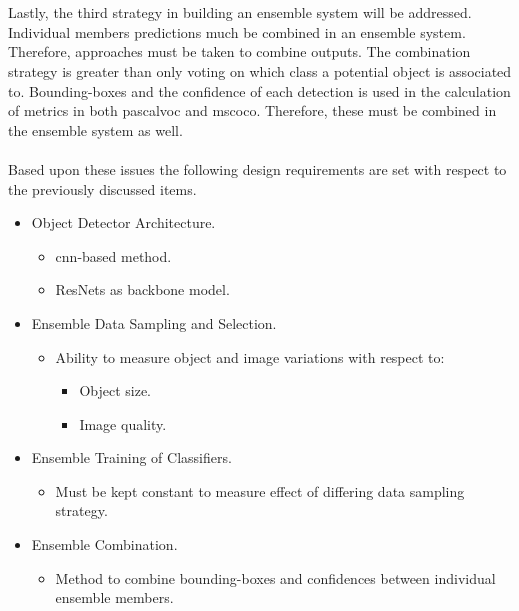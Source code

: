 \\\\
Lastly, the third strategy in building an ensemble system will be addressed. Individual members predictions much be combined in an ensemble system. Therefore, approaches must be taken to combine outputs. The combination strategy is greater than only voting on which class a potential object is associated to. Bounding-boxes and the confidence of each detection is used in the calculation of metrics in both \gls{pascalvoc} and \gls{mscoco}. Therefore, these must be combined in the ensemble system as well.
\\\\
Based upon these issues the following design requirements are set with respect to the previously discussed items.

\begin{itemize}
	
	\item Object Detector Architecture.
	\begin{itemize}
		\item \gls{cnn}-based method.
		\item ResNets as backbone model.
	\end{itemize}

	\item Ensemble Data Sampling and Selection.
	\begin{itemize}
		\item Ability to measure object and image variations with respect to: 
		\begin{itemize}
			\item Object size.
			\item Image quality.
		\end{itemize}
	\end{itemize}

	\item Ensemble Training of Classifiers.
	\begin{itemize}
		\item Must be kept constant to measure effect of differing data sampling strategy.
	\end{itemize}

	\item Ensemble Combination.
	\begin{itemize}
		\item Method to combine bounding-boxes and confidences between individual ensemble members.
	\end{itemize}
\end{itemize}

